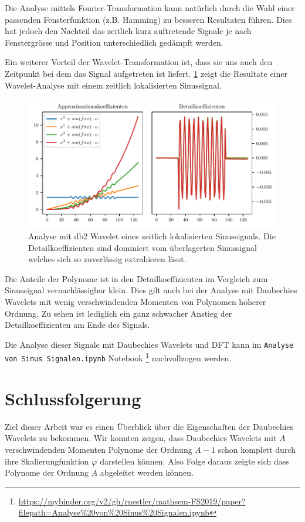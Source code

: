 \begin{refsection}
Die Analyse mittels Fourier-Transformation kann natürlich durch die Wahl einer
passenden Fensterfunktion (z.B. Hamming) zu besseren Resultaten führen. Dies
hat jedoch den Nachteil das zeitlich kurz auftretende Signale je nach
Fenstergrösse und Position unterschiedlich gedämpft werden.

Ein weiterer Vorteil der Wavelet-Transformation ist, dass sie uns auch den
Zeitpunkt bei dem das Signal aufgetreten ist liefert.
\cref{polynomials:sin:padded} zeigt die Resultate einer Wavelet-Analyse mit
einem zeitlich lokalisierten Sinussignal.
\begin{figure}
    \centering
    \includegraphics{papers/polynomials/images/polynomials_sin_padded_db2.pdf}
    \caption{Analyse mit db2 Wavelet eines zeitlich lokalisierten
             Sinussignals. Die Detailkoeffizienten sind dominiert vom
             überlagerten Sinussignal welches sich so zuverlässig extrahieren
             lässt.\label{polynomials:sin:padded}}
\end{figure}
Die Anteile der Polynome ist in den Detailkoeffizienten im Vergleich zum
Sinussignal vernachlässigbar klein. Dies gilt auch bei der Analyse mit
Daubechies Wavelets mit wenig verschwindenden Momenten von Polynomen höherer
Ordnung. Zu sehen ist lediglich ein ganz schwacher Anstieg der
Detailkoeffizienten am Ende des Signals.

Die Analyse dieser Signale mit Daubechies Wavelets und DFT kann im
\texttt{Analyse von Sinus Signalen.ipynb} Notebook%
\footnote{\url{https://mybinder.org/v2/gh/rnestler/mathsem-FS2019/paper?filepath=Analyse\%20von\%20Sinus\%20Signalen.ipynb}}
nachvollzogen werden.

\section{Schlussfolgerung}
Ziel dieser Arbeit war es einen Überblick über die Eigenschaften der Daubechies
Wavelets zu bekommen. Wir konnten zeigen, dass Daubechies Wavelets mit $A$
verschwindenden Momenten Polynome der Ordnung $A-1$ schon komplett durch ihre
Skalierungfunktion $\varphi$ darstellen können. Also Folge daraus zeigte sich
dass Polynome der Ordnung $A$ abgeleitet werden können.


\end{refsection}
